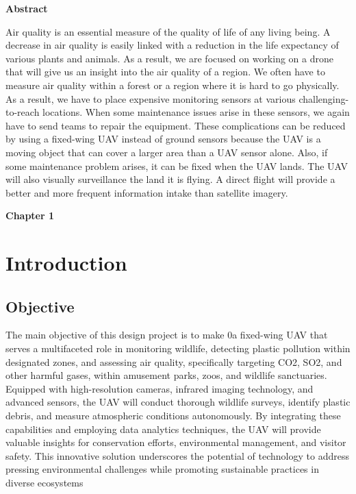 \documentclass[12 pt]{article}
\begin{document}
\newpage

\vspace{\fill}
\noindent

\begin{midpage}
    \centering
\textbf{Abstract} \\ \vspace{0.5 cm}

Air quality is an essential measure of the quality of life of any living being. A decrease in air quality is easily linked with a reduction in the life expectancy of various plants and animals.
As a result, we are focused on working on a drone that will give us an insight into the air quality of a region. 
We often have to measure air quality within a forest or a region where it is hard to go physically. As a result, we have to place expensive monitoring sensors at various challenging-to-reach locations. 
When some maintenance issues arise in these sensors, we again have to send teams to repair the equipment.
These complications can be reduced by using a fixed-wing UAV instead of ground sensors because the UAV is a moving object that can cover a larger area than a UAV sensor alone. Also, if some maintenance problem arises, it can be fixed when the UAV lands.
The UAV will also visually surveillance the land it is flying. A direct flight will provide a better and more frequent information intake than satellite imagery.
\end{midpage}

\vspace{\fill}


\newpage

\tableofcontents

\newpage

\thispagestyle{empty}
\listoffigures
\listoftables
\newpage

\textbf{\Huge{Chapter 1}}
\section{Introduction}

\subsection{Objective}
The main objective of this design project is to make 0a fixed-wing UAV that serves a multifaceted role in monitoring wildlife, detecting plastic pollution within designated zones, and assessing air quality, specifically targeting CO2, SO2, and other harmful gases, within amusement parks, zoos, and wildlife sanctuaries. Equipped with high-resolution cameras, infrared imaging technology, and advanced sensors, the UAV will conduct thorough wildlife surveys, identify plastic debris, and measure atmospheric conditions autonomously. By integrating these capabilities and employing data analytics techniques, the UAV will provide valuable insights for conservation efforts, environmental management, and visitor safety. This innovative solution underscores the potential of technology to address pressing environmental challenges while promoting sustainable practices in diverse ecosystems
\end{document}
